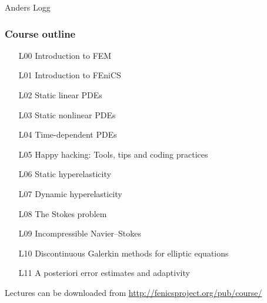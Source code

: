 \documentclass{fenicscourse}
\begin{document}
              {Anders Logg}

\begin{frame}
  \frametitle{Course outline}


  \small

  \begin{enumerate}
  \item[L00]
    Introduction to FEM
  \item[L01]
    Introduction to FEniCS
  \item[L02]
    Static linear PDEs
  \item[L03]
    Static nonlinear PDEs
  \item[L04]
    Time-dependent PDEs
  \item[L05]
    Happy hacking: Tools, tips and coding practices
  \item[L06]
    Static hyperelasticity
  \item[L07]
    Dynamic hyperelasticity
  \item[L08]
    The Stokes problem
  \item[L09]
    Incompressible Navier--Stokes
  \item[L10]
    Discontinuous Galerkin methods for elliptic equations
  \item[L11]
    A posteriori error estimates and adaptivity
  \end{enumerate}

  \normalsize

  {\footnotesize Lectures can be downloaded from
    \url{http://fenicsproject.org/pub/course/}}

\end{frame}
\end{document}
